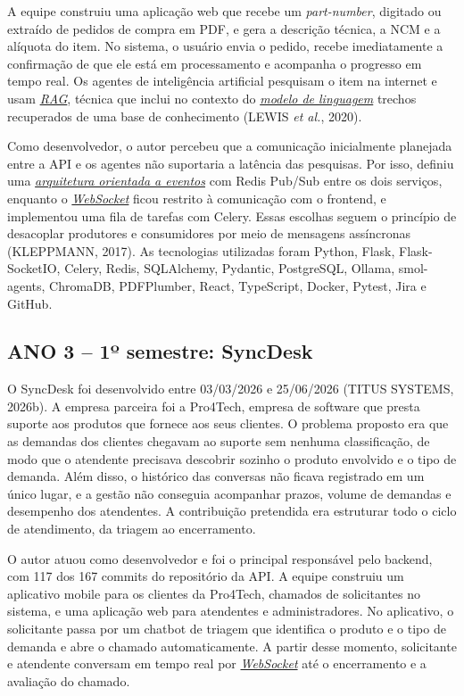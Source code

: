 \documentclass[12pt,a4paper]{article}
\newcommand{\termo}[2]{\hyperlink{gls:#1}{\textit{#2}}}
\begin{document}
A equipe construiu uma aplicação web que recebe um \textit{part-number}, digitado ou extraído de pedidos de compra em PDF, e gera a descrição técnica, a NCM e a alíquota do item. No sistema, o usuário envia o pedido, recebe imediatamente a confirmação de que ele está em processamento e acompanha o progresso em tempo real. Os agentes de inteligência artificial pesquisam o item na internet e usam \termo{rag}{RAG}, técnica que inclui no contexto do \termo{modelo}{modelo de linguagem} trechos recuperados de uma base de conhecimento (LEWIS \textit{et al.}, 2020).

Como desenvolvedor, o autor percebeu que a comunicação inicialmente planejada entre a API e os agentes não suportaria a latência das pesquisas. Por isso, definiu uma \termo{eventos}{arquitetura orientada a eventos} com Redis Pub/Sub entre os dois serviços, enquanto o \termo{websocket}{WebSocket} ficou restrito à comunicação com o frontend, e implementou uma fila de tarefas com Celery. Essas escolhas seguem o princípio de desacoplar produtores e consumidores por meio de mensagens assíncronas (KLEPPMANN, 2017). As tecnologias utilizadas foram Python, Flask, Flask-SocketIO, Celery, Redis, SQLAlchemy, Pydantic, PostgreSQL, Ollama, smol-agents, ChromaDB, PDFPlumber, React, TypeScript, Docker, Pytest, Jira e GitHub.

\subsection{ANO 3 – 1º semestre: SyncDesk}

O SyncDesk foi desenvolvido entre 03/03/2026 e 25/06/2026 (TITUS SYSTEMS, 2026b). A empresa parceira foi a Pro4Tech, empresa de software que presta suporte aos produtos que fornece aos seus clientes. O problema proposto era que as demandas dos clientes chegavam ao suporte sem nenhuma classificação, de modo que o atendente precisava descobrir sozinho o produto envolvido e o tipo de demanda. Além disso, o histórico das conversas não ficava registrado em um único lugar, e a gestão não conseguia acompanhar prazos, volume de demandas e desempenho dos atendentes. A contribuição pretendida era estruturar todo o ciclo de atendimento, da triagem ao encerramento.

O autor atuou como desenvolvedor e foi o principal responsável pelo backend, com 117 dos 167 commits do repositório da API. A equipe construiu um aplicativo mobile para os clientes da Pro4Tech, chamados de solicitantes no sistema, e uma aplicação web para atendentes e administradores. No aplicativo, o solicitante passa por um chatbot de triagem que identifica o produto e o tipo de demanda e abre o chamado automaticamente. A partir desse momento, solicitante e atendente conversam em tempo real por \termo{websocket}{WebSocket} até o encerramento e a avaliação do chamado.
\end{document}
